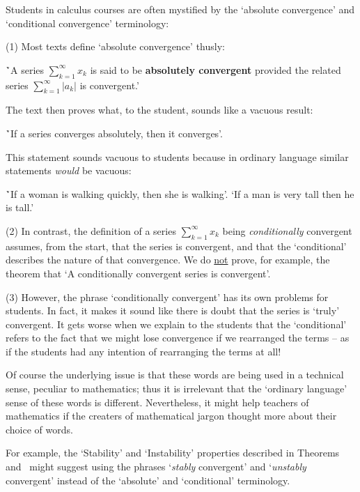 \V

        Students in calculus courses are often mystified by the `absolute convergence' and `conditional convergence' terminology:

\V

        (1) Most texts define `absolute convergence' thusly:
\V

        \h `A series $\sum_{k=1}^{{\infty}} x_{k}$ is said to be {\bf absolutely convergent} provided the related series $\sum_{k=1}^{{\infty}} |a_{k}|$ is convergent.'

\V

\noindent The text then proves what, to the student, sounds like a vacuous result:

        \h `If a series converges absolutely, then it converges'.

\noindent This statement sounds vacuous to students because in ordinary language similar statements {\em would} be vacuous:

        \h `If a woman is walking quickly, then she is walking'. `If a man is very tall then he is tall.'

\V

        (2) In contrast, the definition of a series $\sum_{k=1}^{{\infty}} x_{k}$ being {\em conditionally} convergent assumes, from the start,
    that the series is convergent, and that the `conditional' describes the nature of that convergence.
    We do \underline{not} prove, for example, the theorem that `A conditionally convergent series is convergent'.

\V

        (3) However, the phrase `conditionally convergent' has its own problems for students.
    In fact, it makes it sound like there is doubt that the series is `truly' convergent.
    It gets worse when we explain to the students that the `conditional' refers to the fact that we might lose convergence if we rearranged the terms --
    as if the students had any intention of rearranging the terms at all!

\V

        Of course the underlying issue is that these words are being used in a technical sense, peculiar to mathematics;
    thus it is irrelevant that the `ordinary language' sense of these words is different.
    Nevertheless, it might help teachers of mathematics if the creaters of mathematical jargon thought more about their choice of words.

        For example, the `Stability' and `Instability' properties described in Theorems~ and~ might suggest using the phrases 
    `{\em stably} convergent' and `{\em unstably} convergent' instead of the `absolute' and `conditional' terminology.


